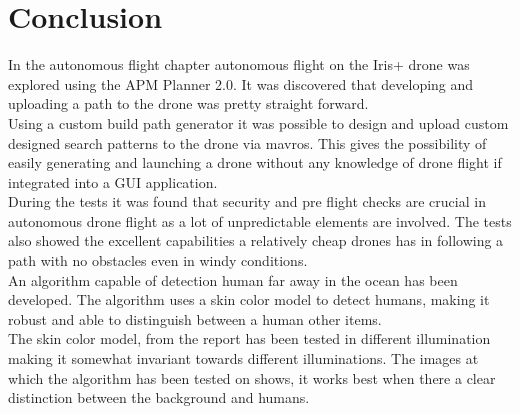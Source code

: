 \chapter{Conclusion}

In the autonomous flight chapter autonomous flight on the Iris+ drone was explored using the APM Planner 2.0. It was discovered that developing and uploading a path to the drone was pretty straight forward.\\

Using a custom build path generator it was possible to design and upload custom designed search patterns to the drone via mavros. This gives the possibility of easily generating and launching a drone without any knowledge of drone flight if integrated into a GUI application.\\

During the tests it was found that security and pre flight checks are crucial in autonomous drone flight as a lot of unpredictable elements are involved. The tests also showed the excellent capabilities a relatively cheap drones has in following a path with no obstacles even in windy conditions.\\

An algorithm capable of detection human far away in the ocean has been developed.  The algorithm uses a skin color model to detect humans, making it robust and able to distinguish between a human other items.\\
The skin color model, from the report \cite{Ref:SkinDetection} has been tested in different illumination making it somewhat invariant towards different illuminations. The images at which the algorithm has been tested on shows, it works best when there a clear distinction between the background and humans.\\



\newpage
